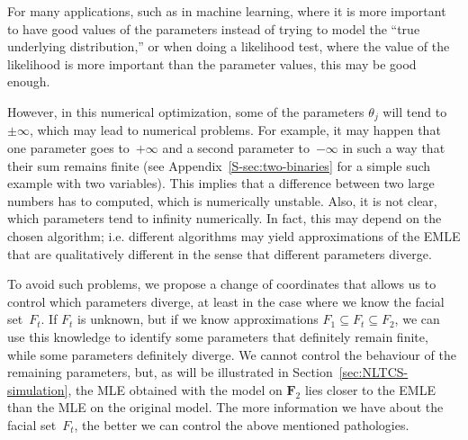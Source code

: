 \documentclass[aos,noinfoline]{imsart}
\newcommand{\Ecal}{\mathcal{E}}
\newcommand{\Fbf}{\mathbf{F}}
\theoremstyle{remark}
\theoremstyle{definition}
\begin{document}
%
For many applications, such as in machine learning, where it is more important to have good values of the parameters
instead of trying to model the ``true underlying distribution,'' or when doing a likelihood test, where the value of the
likelihood is more important than the parameter values, this may be good enough.

However, in this numerical optimization, some of the parameters $\theta_{j}$ will tend to $\pm\infty$, which may lead to
numerical problems.  For example, it may happen that one parameter goes to~$+\infty$ and a second parameter to~$-\infty$
in such a way that their sum remains finite (see Appendix~\ref{S-sec:two-binaries} for a simple such example with two variables).  This implies that a difference between two large numbers has to computed,
which is numerically unstable.  Also, it is not clear, which parameters tend to infinity numerically.  In fact, this may
depend on the chosen algorithm; i.e. different algorithms may yield approximations of the EMLE that are qualitatively
different in the sense that different parameters diverge. 

To avoid such problems, we propose a change of coordinates that allows us to control which parameters diverge, at least
in the case where we know the facial set~$F_{t}$.  If $F_{t}$ is unknown, but if we know approximations
$F_{1}\subseteq F_{t}\subseteq F_{2}$, we can use this knowledge to identify some parameters that definitely remain
finite, while some parameters definitely diverge.  We cannot control the behaviour of the remaining parameters, but, as will be illustrated in Section~\ref{sec:NLTCS-simulation}, the MLE obtained with the model on $\Fbf_2$ lies closer to the EMLE than the MLE on the original model.
The more information we have about the facial set~$F_{t}$, the better we can control the above
mentioned pathologies.
\end{document}
